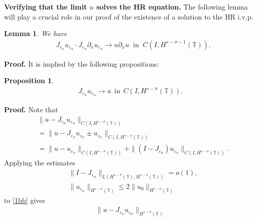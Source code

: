 \documentclass[12pt,reqno]{amsart}
\newcommand{\p}{\partial}
\newcommand{\ci}{\mathbb{T}}
\newcommand{\ee}{\varepsilon}
\theoremstyle{plain}  %
\newtheorem{proposition}{Proposition}
\newtheorem{lemma}{Lemma}
\theoremstyle{definition}
\begin{document}
\begin{appendices}
		{\bf Verifying that the limit $u$ solves the HR equation.} 
		The following lemma will play a crucial role in our proof of the
		existence of a solution to the HR i.v.p.
		\begin{lemma}
			\label{lem:cc}
			We have
			\begin{equation}
				\begin{split}
					\label{burgers_and_nonlocal_conv}
				&  J_{\varepsilon_n} u_{\varepsilon_n} 
				\cdot J_{\varepsilon_n} \p_x u_{\varepsilon_n} 
				\to  u \partial_x u \; \; 
				\text{in} \; \;
				C(I, H^{s-\sigma-1}(\ci)). 
			\end{split}
			\end{equation}
		\end{lemma}
		{\bf Proof.} It is implied by the following propositions:
		\begin{proposition}
			\label{prop:1aa}
			\begin{equation}
				\begin{split}
					 J_{\ee_n} u_{\ee_n} \to  u \ \ \text{in} \ \
					C(I, H^{s-\sigma}(\ci)).
					\label{}
				\end{split}
			\end{equation}
		\end{proposition}
			{\bf Proof.} Note that
			\begin{equation}
				\begin{split}
					& \| u -  J_{\ee_n} u_{\ee_n}
					\|_{C(I, H^{s-\sigma}(\ci))}
					\\
					&= \| u -  J_{\ee_n} u_{\ee_n} \pm 
					u_{\ee_n} \|_{C(I, H^{s-\sigma}(\ci))}
					\\
					& = \| u -  u_{\ee_n}
					\|_{C(I,H^{s-\sigma}(\ci))} + \| (I - J_{\ee_n})
					u_{\ee_n} \|_{C(I, H^{s-\sigma}(\ci))}.
					\label{1bb}
				\end{split}
			\end{equation}
			Applying the estimates
			\begin{equation*}
				\begin{split}
					& \|I-J_{\ee_n} \|_{L(H^{s-\sigma}(\ci), H^{s -
					\sigma}(\ci))} = o(1),
					\\
					& \|u_{\ee_n}\|_{H^{s-\sigma}(\ci)} \le 2
					\|u_0\|_{H^{s-\sigma}(\ci)}
				\end{split}
			\end{equation*}
			to \eqref{1bb} gives
			\begin{equation}
				\label{2bb}
				\begin{split}
					\| u -  J_{\ee_n} u_{\ee_n}\|_{H^{s-\sigma}(\ci)}

\end{split}
\end{equation}
\end{appendices}
\end{document}
